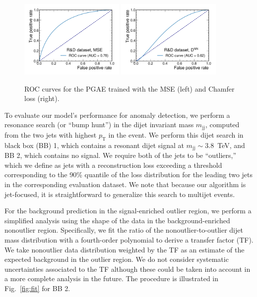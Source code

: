 \documentclass[letterpaper,11pt]{article}
\newcommand{\pt}{\ensuremath{p_{\mathrm{T}}}\xspace}
\begin{document}
\begin{figure}
    \centering
    \includegraphics[width=0.45\textwidth]{figures/gae_mse/roc.pdf}
    \includegraphics[width=0.45\textwidth]{figures/gae_sparseloss/roc.pdf}
    \caption{ROC curves for the PGAE trained with the MSE (left) and Chamfer loss (right).}
    \label{fig:rocs}
\end{figure}

To evaluate our model's performance for anomaly detection, we perform a resonance search (or ``bump hunt'') in the dijet invariant mass $m_\mathrm{jj}$, computed from the two jets with highest $\pt$ in the event. 
We perform this dijet search in black box (BB) 1, which contains a resonant dijet signal at $m_\mathrm{jj}\sim 3.8$~TeV, and BB 2, which contains no signal.
We require both of the jets to be ``outliers,'' which we define as jets with a reconstruction loss exceeding a threshold corresponding to the 90\% quantile of the loss distribution for the leading two jets in the corresponding evaluation dataset.
We note that because our algorithm is jet-focused, it is straightforward to generalize this search to multijet events.


For the background prediction in the signal-enriched outlier region, we perform a simplified analysis using the shape of the data in the background-enriched nonoutlier region.
Specifically, we fit the ratio of the nonoutlier-to-outlier dijet mass distribution with a fourth-order polynomial to derive a transfer factor (TF).
We take nonoutlier data distribution weighted by the TF as an estimate of the expected background in the outlier region. 
We do not consider systematic uncertainties associated to the TF although these could be taken into account in a more complete analysis in the future.
The procedure is illustrated in Fig.~\ref{fig:fit} for BB 2.
\end{document}
